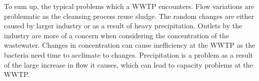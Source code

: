 




To sum up, the typical problems which a WWTP encounters.
Flow variations are problematic as the cleansing process reuse sludge. 
The random changes are either caused by larger industry or as a result of heavy precipitation. Outlets by the industry are more of a concern when considering the concentration of the wastewater. Changes in concentration can cause inefficiency at the WWTP as the bacteria need time to acclimate to changes. Precipitation is a problem as a result of the large increase in flow it causes, which can lead to capacity problems at the WWTP.  
